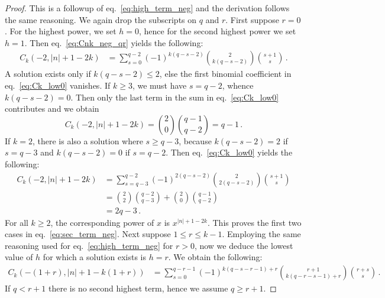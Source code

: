 \documentclass[review]{elsarticle}
\theoremstyle{plain}
\begin{document}
\begin{proof}
This is a followup of eq.~\eqref{eq:high_term_neg} and the derivation follows the same reasoning.
We again drop the subscripts on $q$ and $r$.
First suppose $r=0$.
For the highest power, we set $h=0$, hence for the second highest power we set $h=1$.
Then eq.~\eqref{eq:Cnk_neg_qr} yields the following:
\begin{equation}
\label{eq:Ck_low0}
\begin{split}
  C_k(-2,|n|+1-2k) &= \sum_{s=0}^{q-2} (-1)^{k(q-s-2)} \binom{2}{k(q-s-2)} \binom{s+1}{s} \,.
\end{split}
\end{equation}
A solution exists only if $k(q-s-2)\le2$, else the first binomial coefficient in eq.~\eqref{eq:Ck_low0} vanishes.
If $k\ge3$, we must have $s=q-2$, whence $k(q-s-2)=0$.
Then only the last term in the sum in eq.~\eqref{eq:Ck_low0} contributes and we obtain %
\begin{equation}
C_k(-2,|n|+1-2k) = \binom{2}{0} \binom{q-1}{q-2} = q-1 \,.
\end{equation}
If $k=2$, there is also a solution where $s\ge q-3$, because $k(q-s-2) = 2$ if $s=q-3$ and $k(q-s-2) = 0$ if $s=q-2$. 
Then eq.~\eqref{eq:Ck_low0} yields the following:
\begin{equation}
\begin{split}
  C_k(-2,|n|+1-2k) &= \sum_{s=q-3}^{q-2} (-1)^{2(q-s-2)} \binom{2}{2(q-s-2)} \binom{s+1}{s}
  \\
  &= \binom{2}{2} \binom{q-2}{q-3} + \binom{2}{0} \binom{q-1}{q-2}
  \\
  &= 2q-3 \,.
\end{split}
\end{equation}
For all $k\ge2$, the corresponding power of $x$ is $x^{|n|+1-2k}$.
This proves the first two cases in eq.~\eqref{eq:sec_term_neg}.
Next suppose $1 \le r \le k-1$. 
Employing the same reasoning used for eq.~\eqref{eq:high_term_neg} for $r>0$,
now we deduce the lowest value of $h$ for which a solution exists is $h=r$. We obtain the following:
\begin{equation}
\label{eq:Ck_low1}
\begin{split}
  C_k(-(1+r),|n|+1-k(1+r)) &= \sum_{s=0}^{q-r-1} (-1)^{k(q-s-r-1)+r} %
  \binom{r+1}{k(q-r-s-1)+r} \binom{r+s}{s} \,.
\end{split}
\end{equation}
If $q<r+1$ there is no second highest term, hence we assume $q\ge r+1$.

\end{proof}
\end{document}
